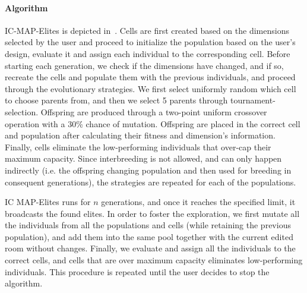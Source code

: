 \paragraph{Algorithm}

IC-MAP-Elites is depicted in~. Cells are first created based on the dimensions selected by the user and proceed to initialize the population based on the user's design, evaluate it and assign each individual to the corresponding cell. Before starting each generation, we check if the dimensions have changed, and if so, recreate the cells and populate them with the previous individuals, and proceed through the evolutionary strategies. We first select uniformly random which cell to choose parents from, and then we select 5 parents through tournament-selection. Offspring are produced through a two-point uniform crossover operation with a 30\% chance of mutation. Offspring are placed in the correct cell and population after calculating their fitness and dimension's information. Finally, cells eliminate the low-performing individuals that over-cap their maximum capacity. Since interbreeding is not allowed, and can only happen indirectly (i.e. the offspring changing population and then used for breeding in consequent generations), the strategies are repeated for each of the populations.

IC MAP-Elites runs for $n$ generations, and once it reaches the specified limit, it broadcasts the found elites. In order to foster the exploration, we first mutate all the individuals from all the populations and cells (while retaining the previous population), and add them into the same pool together with the current edited room without changes. Finally, we evaluate and assign all the individuals to the correct cells, and cells that are over maximum capacity eliminates low-performing individuals. This procedure is repeated until the user decides to stop the algorithm.